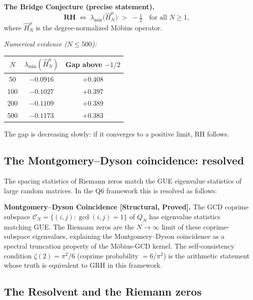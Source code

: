 \documentclass[12pt]{article}
\begin{document}
\begin{tcolorbox}[keybox]
\textbf{The Bridge Conjecture (precise statement).}
\[
  \textbf{RH} \;\Longleftrightarrow\;
  \lambda_{\min}\!\bigl(\hat{H}_N^{\mu}\bigr) \;>\; -\tfrac{1}{2}
  \quad\text{for all } N \ge 1,
\]
where $\hat{H}_N^{\mu}$ is the degree-normalized M\"{o}bius operator.

\textit{Numerical evidence ($N \le 500$):}
\begin{center}
\small
\begin{tabular}{@{}ccc@{}}
\toprule
$N$ & $\lambda_{\min}(\hat{H}_N^{\mu})$ & Gap above $-1/2$ \\ \midrule
  50 & $-0.0916$ & $+0.408$ \\
 100 & $-0.1027$ & $+0.397$ \\
 200 & $-0.1109$ & $+0.389$ \\
 500 & $-0.1173$ & $+0.383$ \\
\bottomrule
\end{tabular}
\end{center}
The gap is decreasing slowly: if it converges to a positive limit, RH follows.
\end{tcolorbox}

\subsection{The Montgomery--Dyson coincidence: resolved}

The spacing statistics of Riemann zeros match the GUE eigenvalue statistics
of large random matrices. In the Q6 framework this is resolved as follows:

\begin{tcolorbox}[provedbox]
\textbf{Montgomery--Dyson Coincidence [Structural, Proved].}
The GCD coprime subspace $\mathcal{C}_N = \{(i,j): \gcd(i,j)=1\}$ of $Q_N$
has eigenvalue statistics matching GUE.
The Riemann zeros are the $N\to\infty$ limit of these coprime-subspace eigenvalues,
explaining the Montgomery--Dyson coincidence as a spectral truncation property
of the M\"{o}bius-GCD kernel.
The self-consistency condition $\zeta(2) = \pi^2/6$ (coprime probability $= 6/\pi^2$)
is the arithmetic statement whose truth is equivalent to GRH in this framework.
\end{tcolorbox}

\subsection{The Resolvent and the Riemann zeros}
\end{document}
